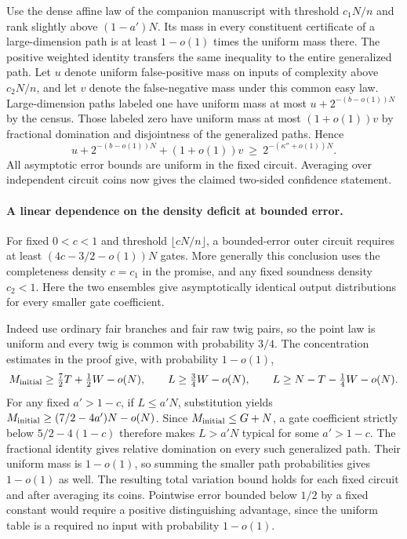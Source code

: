 Use the dense affine law of the companion manuscript \cite{local}
with threshold $c_1N/n$ and rank slightly above $(1-a')N$.
Its mass in every constituent certificate of a large-dimension path
is at least $1-o(1)$ times the uniform mass there. The positive
weighted identity transfers the same inequality to the entire
generalized path. Let $u$ denote uniform false-positive mass
on inputs of complexity above $c_2N/n$, and let $v$ denote the
false-negative mass under this common easy law. Large-dimension
paths labeled one have uniform mass at most $u+2^{-(b-o(1))N}$
by the census. Those labeled zero have uniform mass at most
$(1+o(1))v$ by fractional domination and disjointness of the
generalized paths. Hence
\[
 u+2^{-(b-o(1))N}+(1+o(1))v
 \ \ge\ 2^{-(\kappa''+o(1))N}.
\]
All asymptotic error bounds are uniform in the fixed circuit.
Averaging over independent circuit coins now gives the claimed
two-sided confidence statement.

\paragraph{A linear dependence on the density deficit at bounded error.}
For fixed $0<c<1$ and threshold $\lfloor cN/n\rfloor$, a bounded-error
outer circuit requires at least $(4c-3/2-o(1))N$ gates. More generally
this conclusion uses the completeness density $c=c_1$ in the promise,
and any fixed soundness density $c_2<1$. Here the two ensembles give
asymptotically identical output distributions for every smaller gate
coefficient.

Indeed use ordinary fair branches and fair raw twig pairs, so the point
law is uniform and every twig is common with probability $3/4$.
The concentration estimates in the proof give, with probability
$1-o(1)$,
\[
 M_{\rm initial}\ge\tfrac72 T+\tfrac12 W-o(N),\qquad
 L\ge \tfrac34 W-o(N),\qquad L\ge N-T-\tfrac14 W-o(N).
\]
For any fixed $a'>1-c$, if $L\le a'N$, substitution yields
$M_{\rm initial}\ge (7/2-4a')N-o(N)$. Since $M_{\rm initial}\le G+N$,
a gate coefficient strictly below $5/2-4(1-c)$ therefore makes
$L>a'N$ typical for some $a'>1-c$. The fractional identity gives
relative domination on every such generalized path. Their uniform
mass is $1-o(1)$, so summing the smaller path probabilities gives
$1-o(1)$ as well. The resulting total variation bound holds for
each fixed circuit and after averaging its coins. Pointwise error
bounded below $1/2$ by a fixed constant would require a positive
distinguishing advantage, since the uniform table is a required no
input with probability $1-o(1)$.
